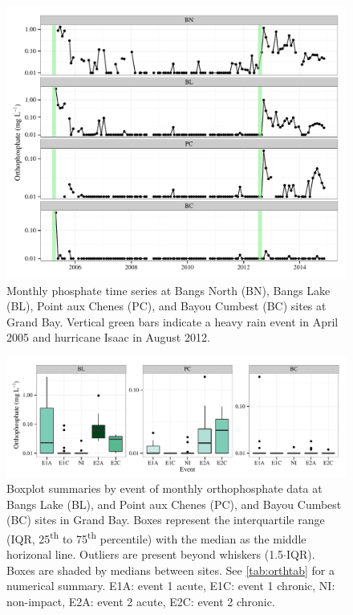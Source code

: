 \documentclass[letterpaper,12pt]{article}\usepackage[]{graphicx}\usepackage[]{color}
\makeatletter
\def\maxwidth{ %
  \ifdim\Gin@nat@width>\linewidth
    \linewidth
  \else
    \Gin@nat@width
  \fi
}
\makeatother
\begin{document}
\begin{figure}[!ht]

{\centering \includegraphics[width=\maxwidth]{figs/orthtsfig-1} 

}

\caption[Monthly phosphate time series at Bangs North (BN), Bangs Lake (BL), Point aux Chenes (PC), and Bayou Cumbest (BC) sites at Grand Bay]{Monthly phosphate time series at Bangs North (BN), Bangs Lake (BL), Point aux Chenes (PC), and Bayou Cumbest (BC) sites at Grand Bay. Vertical green bars indicate a heavy rain event in April 2005 and hurricane Isaac in August 2012.}\label{fig:orthtsfig}
\end{figure}


\clearpage

\begin{figure}[!ht]

{\centering \includegraphics[width=\maxwidth]{figs/orthfig-1} 

}

\caption{Boxplot summaries by event of monthly orthophosphate data at Bangs Lake (BL), and Point aux Chenes (PC), and Bayou Cumbest (BC) sites in Grand Bay.  Boxes represent the interquartile range (IQR, 25\textsuperscript{th} to 75\textsuperscript{th} percentile) with the median as the middle horizonal line.  Outliers are present beyond whiskers (1.5$\cdot$IQR). Boxes are shaded by medians between sites.  See \cref{tab:orthtab} for a numerical summary. E1A: event 1 acute, E1C: event 1 chronic, NI: non-impact, E2A: event 2 acute, E2C: event 2 chronic.}\label{fig:orthfig}
\end{figure}
\end{document}
